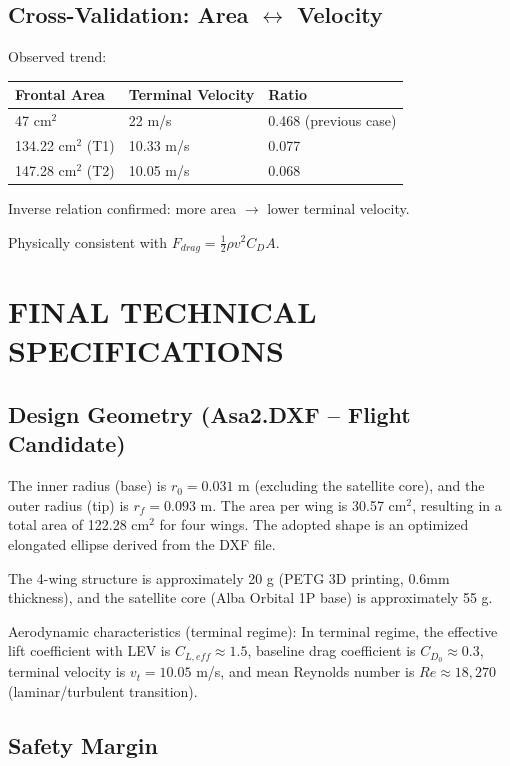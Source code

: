 \documentclass[12pt,a4paper]{article}
\begin{document}
\subsection{Cross-Validation: Area $\leftrightarrow$ Velocity}

Observed trend:

\begin{longtable}{@{}lll@{}}
\toprule
Frontal Area & Terminal Velocity & Ratio \\
\midrule
47 cm$^2$ & 22 m/s & 0.468 (previous case) \\
134.22 cm$^2$ (T1) & 10.33 m/s & 0.077 \\
147.28 cm$^2$ (T2) & 10.05 m/s & 0.068 \\
\bottomrule
\end{longtable}

Inverse relation confirmed: more area $\rightarrow$ lower terminal velocity.

Physically consistent with $F_{drag} = \frac{1}{2}\rho v^2 C_D A$.

\vspace{0.5em}

\section{FINAL TECHNICAL SPECIFICATIONS}
\label{sec:final-specifications}

\subsection{Design Geometry (Asa2.DXF -- Flight Candidate)}

The inner radius (base) is $r_0 = 0.031$ m (excluding the satellite core), and the outer radius (tip) is $r_f = 0.093$ m. The area per wing is 30.57 cm$^2$, resulting in a total area of 122.28 cm$^2$ for four wings. The adopted shape is an optimized elongated ellipse derived from the DXF file.

The 4-wing structure is approximately 20 g (PETG 3D printing, 0.6mm thickness), and the satellite core (Alba Orbital 1P base) is approximately 55 g.

Aerodynamic characteristics (terminal regime):
In terminal regime, the effective lift coefficient with LEV is $C_{L,eff} \approx 1.5$, baseline drag coefficient is $C_{D_0} \approx 0.3$, terminal velocity is $v_t = 10.05$ m/s, and mean Reynolds number is $Re \approx 18{,}270$ (laminar/turbulent transition).

\subsection{Safety Margin}
\end{document}
